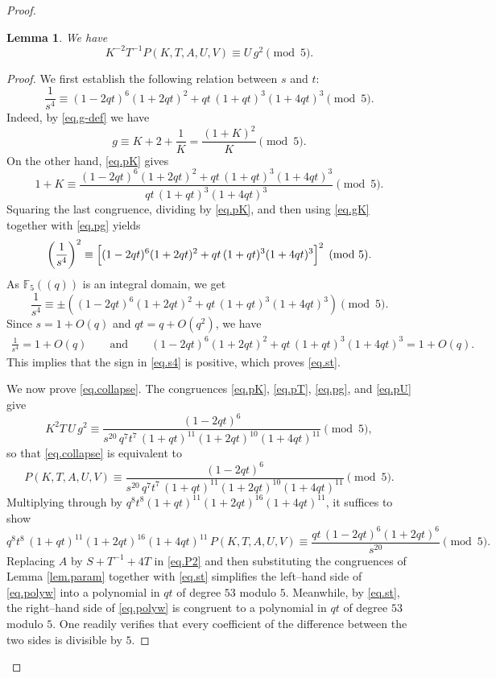 \documentclass{amsart}
\newtheorem{lemma}[theorem]{Lemma}
\theoremstyle{definition}
\begin{document}
\begin{proof}
\begin{lemma}\label{lem.collapse}
We have
\begin{equation}
K^{-2}T^{-1}P(K,T,A,U,V)\equiv U\, g^{2} \pmod 5.
\label{eq.collapse}
\end{equation}
\end{lemma}

\begin{proof}
We first establish the following relation between $s$ and $t$:
\begin{equation}\label{eq.st}
\frac1{s^{4}}\equiv(1-2qt)^{6}(1+2qt)^{2}+qt\,(1+qt)^{3}(1+4qt)^{3}\pmod 5 .
\end{equation}
Indeed, by \eqref{eq.g-def} we have
\begin{equation}\label{eq.gK}
	g\equiv K+2+\frac1K=\frac{(1+K)^{2}}{K}\pmod 5.
\end{equation}
On the other hand, \eqref{eq.pK} gives
\[
1+K\equiv\frac{(1-2qt)^{6}(1+2qt)^{2}+qt\,(1+qt)^{3}(1+4qt)^{3}}{qt\,(1+qt)^{3}(1+4qt)^{3}}\pmod 5.
\]
Squaring the last congruence, dividing by \eqref{eq.pK}, and then using \eqref{eq.gK} together with \eqref{eq.pg} yields
\[
\left(\frac1{s^{4}}\right)^2\equiv\Bigl[(1-2qt)^{6}(1+2qt)^{2}+qt\,(1+qt)^{3}(1+4qt)^{3}\Bigr]^{2}\pmod 5.
\]
As $\mathbb{F}_5((q))$ is an integral domain, we get
\begin{equation}\label{eq.s4}
	\frac1{s^{4}}\equiv\pm\left((1-2qt)^{6}(1+2qt)^{2}+qt\,(1+qt)^{3}(1+4qt)^{3}\right)\pmod 5.
\end{equation}
Since $s=1+O(q)$ and $qt=q+O(q^{2})$, we have
\begin{align*}
	\frac1{s^{4}}=1+O(q)\qquad\text{and}\qquad
	(1-2qt)^{6}(1+2qt)^{2}+qt\,(1+qt)^{3}(1+4qt)^{3}=1+O(q).
\end{align*}
This implies that the sign in \eqref{eq.s4} is positive, which proves \eqref{eq.st}.  

We now prove \eqref{eq.collapse}.  The congruences \eqref{eq.pK}, \eqref{eq.pT}, \eqref{eq.pg}, and \eqref{eq.pU}  give
\[
K^{2}T\,U\,g^{2}\equiv\frac{(1-2qt)^{6}}{s^{20}\,q^{7}t^{7}\,(1+qt)^{11}(1+2qt)^{10}(1+4qt)^{11}}\pmod 5,
\]
so that \eqref{eq.collapse} is equivalent to
\[
P(K,T,A,U,V)\equiv\frac{(1-2qt)^{6}}{s^{20}\,q^{7}t^{7}\,(1+qt)^{11}(1+2qt)^{10}(1+4qt)^{11}}\pmod 5.
\]
Multiplying through by $q^{8}t^{8}(1+qt)^{11}(1+2qt)^{16}(1+4qt)^{11}$, it suffices to show
\begin{equation}\label{eq.polyw}
q^{8}t^{8}\,(1+qt)^{11}(1+2qt)^{16}(1+4qt)^{11}\,P(K,T,A,U,V)
\equiv \frac{qt\,(1-2qt)^{6}(1+2qt)^{6}}{s^{20}}\pmod 5.
\end{equation}
Replacing $A$ by $S+T^{-1}+4T$ in \eqref{eq.P2} and then substituting the congruences of Lemma \ref{lem.param} together with \eqref{eq.st} simplifies the left--hand side of \eqref{eq.polyw} into a polynomial in $qt$ of degree $53$ modulo $5$. Meanwhile, by \eqref{eq.st}, the right--hand side of \eqref{eq.polyw} is congruent to a polynomial in $qt$ of degree $53$ modulo $5$. One readily verifies that every coefficient of the difference between the two sides is divisible by $5$.
\end{proof}


\end{proof}
\end{document}

